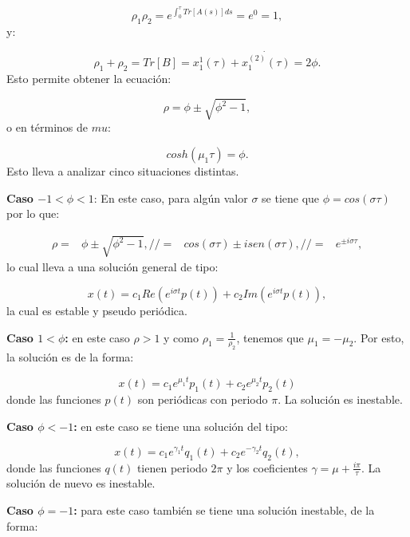 \documentclass[a4paper,10pt]{report}
\begin{document}
\begin{equation}
\rho_1 \rho_2 = e^{\int_0^\tau Tr[A(s)]ds} = e^0 = 1,
\end{equation} y:

\begin{equation}
\rho_1 + \rho_2 = Tr[B] =x_1^1(\tau)+ \dot{x_1^{(2)}(\tau)} = 2\phi.
\end{equation} Esto permite obtener la ecuación:

\begin{equation}
\rho = \phi \pm \sqrt{\phi^2 -1},
\end{equation} o en términos de $mu$:

\begin{equation}
cosh(\mu_1 \tau) = \phi.
\end{equation} Esto lleva a analizar cinco situaciones distintas.

\textbf{Caso $ -1 < \phi < 1$}: En este caso, para algún valor $\sigma$ se tiene que $\phi = cos(\sigma \tau)$ por lo que:

\begin{align*}
\rho =& \phi \pm \sqrt{\phi^2 -1},//
=& cos(\sigma \tau) \pm isen(\sigma \tau), //
=& e^{\pm i\sigma \tau},
\end{align*} lo cual lleva a una solución general de tipo:

\begin{equation}
x(t) = c_1 Re(e^{i\sigma t} p(t)) + c_2 Im(e^{i\sigma t} p(t)),
\end{equation} la cual es estable y pseudo periódica.

\textbf{Caso $1 < \phi$:} en este caso $\rho > 1$ y como $\rho_1 = \frac{1}{\rho_2}$, tenemos que $\mu_1 = -\mu_2$. Por esto, la solución es de la forma:

\begin{equation}
x(t) = c_1 e^{\mu_1 t}p_1(t) + c_2 e^{\mu_2 t}p_2(t)
\end{equation} donde las funciones $p(t)$ son periódicas con periodo $\pi$. La solución es inestable.

\textbf{Caso $\phi < -1$:} en este caso se tiene una solución del tipo:

\begin{equation}
x(t) =c_1 e^{\gamma_1 t}q_1(t) + c_2 e^{-\gamma_2 t}q_2(t),
\end{equation} donde las funciones $q(t)$ tienen periodo $2\pi$ y los coeficientes $\gamma = \mu + \frac{i\pi}{\tau}$. La solución de nuevo es inestable.

\textbf{Caso $\phi = -1$:} para este caso también se tiene una solución inestable, de la forma:
\end{document}
